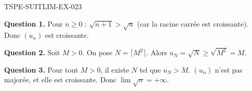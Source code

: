 \begin{corrige}{TSPE-SUITLIM-EX-023}

\textbf{Question 1.} Pour $n \geq 0$ : $\sqrt{n+1} > \sqrt{n}$ (car la racine carrée est croissante). Donc $(u_n)$ est croissante.

\textbf{Question 2.} Soit $M > 0$. On pose $N = \lceil M^2 \rceil$. Alors $u_N = \sqrt{N} \geq \sqrt{M^2} = M$.

\textbf{Question 3.} Pour tout $M > 0$, il existe $N$ tel que $u_N > M$. $(u_n)$ n'est pas majorée, et elle est croissante. Donc $\boxed{\lim \sqrt{n} = +\infty}$.

\end{corrige}
